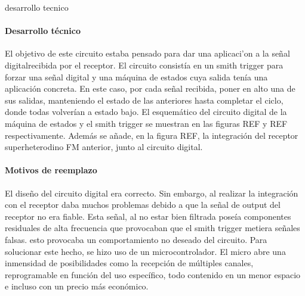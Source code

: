 desarrollo tecnico
\paragraph{Desarrollo técnico}
El objetivo de este circuito estaba pensado para dar una aplicaci'on a la señal digitalrecibida por el receptor. El circuito consistía en un smith trigger para forzar una señal digital y una máquina de estados cuya salida tenía una aplicación concreta. En este caso, por cada señal recibida, poner en alto una de sus salidas, manteniendo el estado de las anteriores hasta completar el ciclo, donde todas volverían a estado bajo. 
El esquemático del circuito digital de la máquina de estados y el smith trigger se muestran en las figuras REF y REF respectivamente.
Además se añade, en la figura REF, la integración del receptor superheterodino FM anterior, junto al circuito digital.

\paragraph{Motivos de reemplazo}
El diseño del circuito digital era correcto. Sin embargo, al realizar la integración con el receptor daba muchos problemas debido a que la señal de output del receptor no era fiable. Esta señal, al no estar bien filtrada poseía componentes residuales de alta frecuencia que provocaban que el smith trigger metiera señales falsas. esto provocaba un comportamiento no deseado del circuito. 
Para solucionar este hecho, se hizo uso de un microcontrolador. El micro abre una inmensidad de posibilidades como la recepci\'on de múltiples canales, reprogramable en función del uso específico, todo contenido en un menor espacio e incluso con un precio más económico.
